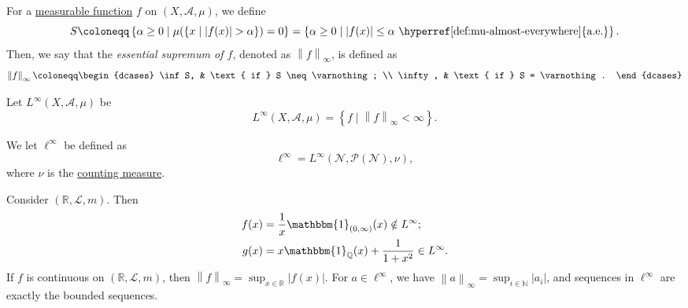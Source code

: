 \begin{definition}\label{def:essential-sumpremum}
	For a \hyperref[def:measurable-function]{measurable function} \(f\) on \((X, \mathcal{A} , \mu )\), we define
	\[
		S \coloneqq \left\{\alpha \geq 0\mid \mu (\{x\mid \left\vert f(x) \right\vert > \alpha \}) = 0\right\}
		= \left\{\alpha \geq 0\mid \left\vert f(x) \right\vert \leq \alpha \text{ \hyperref[def:mu-almost-everywhere]{a.e.}} \right\}.
	\]
	Then, we say that the \emph{essential supremum of \(f\)}, denoted as \(\left\lVert f\right\rVert _\infty \), is defined as
	\[
		\left\lVert f\right\rVert _\infty \coloneqq \begin{dcases}
			\inf S,  & \text{ if } S \neq \varnothing; \\
			\infty , & \text{ if } S = \varnothing.
		\end{dcases}
	\]
\end{definition}

\begin{definition}\label{def:L-infinity-space}
	Let \(L^{\infty} (X, \mathcal{A} , \mu )\) be
	\[
		L^{\infty} (X, \mathcal{A} , \mu ) = \left\{f\mid \left\lVert f\right\rVert _\infty < \infty \right\}.
	\]
\end{definition}

\begin{definition}\label{def:l-infinity-space}
	We let \(\ell ^{\infty} \) be defined as
	\[
		\ell ^{\infty} = L^{\infty} (\mathcal{N} , \mathcal{P} (\mathcal{N} ), \nu ),
	\]
	where \(\nu\) is the \hyperref[eg:counting-measure]{counting measure}.
\end{definition}

\begin{eg}
	Consider \((\mathbb{R} , \mathcal{L} , m)\). Then
	\[
		\begin{split}
			f(x) & = \frac{1}{x} \mathbbm{1}_{(0, \infty )} (x) \notin L^{\infty};         \\
			g(x) & = x \mathbbm{1}_{\mathbb{Q} }(x) + \frac{1}{1 + x^{2} } \in L^{\infty}.
		\end{split}
	\]
	If \(f\) is continuous on \((\mathbb{R} , \mathcal{L} , m)\), then \(\left\lVert f\right\rVert _\infty = \sup _{x\in \mathbb{R} }\left\vert f(x) \right\vert \). For \(a\in \ell ^{\infty} \), we have \(\left\lVert a\right\rVert _\infty = \sup _{i\in \mathbb{N} }\left\vert a_{i}  \right\vert\), and sequences in \(\ell ^{\infty} \) are exactly the bounded sequences.
\end{eg}

